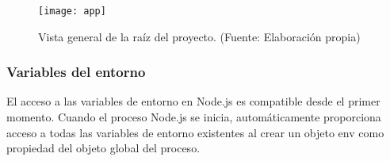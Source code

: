 \begin{figure}[H]
  \centering
  \texttt{[image: app]}
  \caption{Vista general de la raíz del proyecto. (Fuente: Elaboración propia)}
\end{figure}

\newpage
\subsubsection{Variables del entorno}
El acceso a las variables de entorno en Node.js es compatible desde el primer momento. Cuando el proceso Node.js se inicia, automáticamente proporciona acceso a todas las variables de entorno existentes al crear un objeto env como propiedad del objeto global del proceso.
\vspace{0.8cm}


